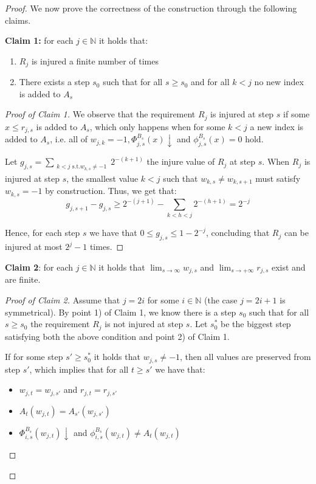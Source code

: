 \documentclass[12pt,a4paper]{article}
\theoremstyle{definition}
\newcommand{\N}{\mathbb{N}}                     %
\begin{document}
\begin{proof}
        We now prove the correctness of the construction through the following claims.

        \textbf{Claim 1:} for each $j \in \N$ it holds that:
        \begin{enumerate}
            \item $R_j$ is injured a finite number of times
            \item There exists a step $s_0$ such that for all $s \geq s_0$ and for all $k < j$ no new index is added to $A_s$
        \end{enumerate}

        \begin{proof}[Proof of Claim 1]
            We observe that the requirement $R_j$ is injured at step $s$ if some $x \leq r_{j,s}$ is added to $A_s$, which only happens when for some $k < j$ a new index is added to $A_s$, i.e. all of $w_{j,k} = -1, \Phi_{j,s}^{B_s} (x) \downarrow$ and $\phi_{j,s}^{B_s}(x) = 0$ hold.

            Let $g_{j,s} = \sum_{\substack{k < j \text{ s.t.} w_{k,s} \neq -1}} 2^{-(k+1)}$ the injure value of $R_j$ at step $s$. When $R_j$ is injured at step $s$, the smallest value $k < j$ such that $w_{k,s} \neq w_{k,s+1}$ must satisfy $w_{k,s} = -1$ by construction. Thus, we get that:
            \[g_{j,s+1} - g_{j,s} \geq 2^{-(j+1)} - \sum_{k < h < j} 2^{-(h+1)} = 2^{-j}\]

            Hence, for each step $s$ we have that $0 \leq g_{j,s} \leq 1-2^{-j}$, concluding that $R_j$ can be injured at most $2^{j}-1$ times.
        \end{proof}

        \textbf{Claim 2}: for each $j \in \N$ it holds that $\lim_{s \to \infty} w_{j,s}$ and $\lim_{s \to +\infty} r_{j,s}$ exist and are finite.

        \begin{proof}[Proof of Claim 2]
            Assume that $j = 2i$ for some $i \in \N$ (the case $j = 2i+1$ is symmetrical). By point 1) of Claim 1, we know there is a step $s_0$ such that for all $s \geq s_0$ the requirement $R_j$ is not injured at step $s$. Let $s_0^*$ be the biggest step satisfying both the above condition and point 2) of Claim 1.
            
            If for some step $s' \geq s_0^*$ it holds that $w_{j,s} \neq -1$, then all values are preserved from step $s'$, which implies that for all $t \geq s'$ we have that:
            \begin{itemize}
                \item $w_{j,t} = w_{j,s'}$ and $r_{j,t} = r_{j,s'}$
                \item $A_t(w_{j,t}) = A_{s'}(w_{j,s'})$
                \item $\Phi_{i, s}^{B_s}(w_{j,t}) \downarrow$ and $\phi_{i, s}^{B_s}(w_{j,t}) \neq A_{t}(w_{j,t})$
            \end{itemize}


\end{proof}
\end{proof}
\end{document}
